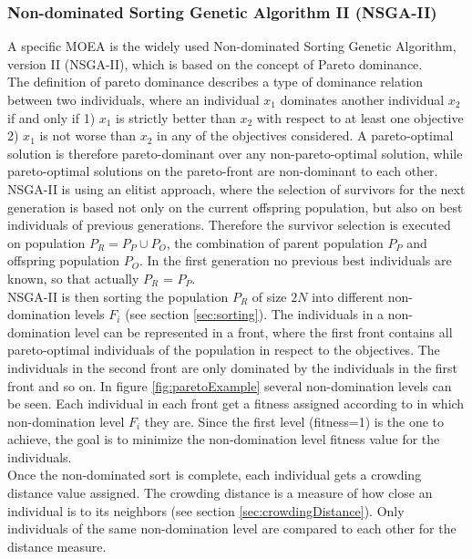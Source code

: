     \subsubsection{Non-dominated Sorting Genetic Algorithm II (NSGA-II)}
    A specific MOEA is the widely used Non-dominated Sorting Genetic Algorithm, version II (NSGA-II)\cite{Deb:2002}, which is based on the concept of Pareto dominance.\\
    The definition of pareto dominance describes a type of dominance relation between two individuals, where an individual $x_1$ dominates another individual $x_2$ if and only if 1) $x_1$ is strictly better than $x_2$ with respect to at least one objective 2) $x_1$ is not worse than $x_2$ in any of the objectives considered\cite{clune2013evolutionary}. A pareto-optimal solution is therefore pareto-dominant over any non-pareto-optimal solution, while pareto-optimal solutions on the pareto-front are non-dominant to each other.\\
    NSGA-II is using an elitist approach, where the selection of survivors for the next generation is based not only on the current offspring population, but also on best individuals of previous generations. Therefore the survivor selection is executed on population $P_R = P_P \cup P_O$, the combination of parent population $P_P$ and offspring population $P_O$. In the first generation no previous best individuals are known, so that actually $P_R$ = $P_P$.\\
    NSGA-II is then sorting the population $P_R$ of size $2N$ into different non-domination levels $F_i$ (see section \ref{sec:sorting}). The individuals in a non-domination level can be represented in a front, where the first front contains all pareto-optimal individuals of the population in respect to the objectives. The individuals in the second front are only dominated by the individuals in the first front and so on. In figure \ref{fig:paretoExample} several non-domination levels can be seen. Each individual in each front get a fitness assigned according to in which non-domination level $F_i$ they are. Since the first level (fitness=1) is the one to achieve, the goal is to minimize the non-domination level fitness value for the individuals.\\
    Once the non-dominated sort is complete, each individual gets a crowding distance value assigned. The crowding distance is a measure of how close an individual is to its neighbors (see section \ref{sec:crowdingDistance}). Only individuals of the same non-domination level are compared to each other for the distance measure.\\

